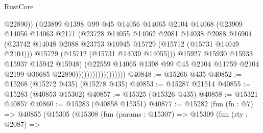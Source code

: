 \begin{lexlean}{RustCore}
\begin{coremodule}
                                        @22890))
                                    (@23899
                                      @1398
                                      @99
                                      @45
                                      @14056
                                      @14065
                                      @2104
                                      @14068
                                      (@23909
                                        @14056
                                        @14063
                                        @2171
                                        (@23728
                                          @14055
                                          @14062
                                          @2081
                                          @14038
                                          @2088
                                          @16904
                                          (@23742
                                            @14048
                                            @2088
                                            @23753
                                            @16945
                                            @15729
                                            (@15712 (@15731 @14049 @2104)))
                                          @15729
                                          (@15712 (@15731 @14039 @14055)))
                                        @15927
                                        @15930
                                        @15933
                                        @15937
                                        @15942
                                        @15948)
                                      (@22559
                                        @14065
                                        @1398
                                        @99
                                        @45
                                        @2104
                                        @11759
                                        @2104
                                        @2199
                                        @36685
                                        @22890))))))))))))))))))
@40848 := @15266 @435
@40852 := @15268 (@15272 @435) (@15278 @435)
@40853 := @15287 @21514
@40855 := @15283 (@40853 @15302)
@40857 := @15325 (@15326 @435)
@40858 := @15321 @40857
@40860 := @15283 (@40858 @15351)
@40877 := @15282
    (fun (fn : @7) =>
    @40855
      (@15305
        (@15308
          (fun (params : @15307) =>
          @15309
            (fun (rty : @2087) =>

\end{coremodule}
\end{lexlean}
